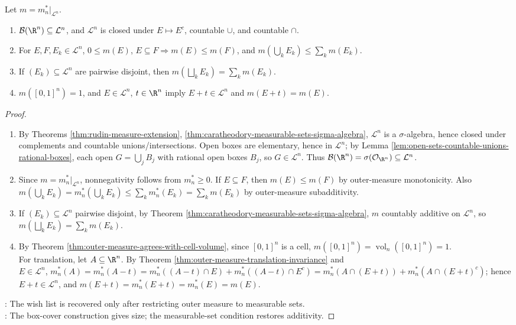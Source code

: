 \begin{theorem} \label{thm:lebesgue-measure-basic-properties-checklist} \\
Let $m=m_n^\ast|_{\mathcal{L}^n}$.
\begin{enumerate}[label=(\roman*)]
\setlength{\itemsep}{0pt}
\item $\mathcal{B}(\R^n)\subseteq\mathcal{L}^n$, and $\mathcal{L}^n$ is closed under $E\mapsto E^c$, countable $\cup$, and countable $\cap$.
\item For $E,F,E_k\in\mathcal{L}^n$, $0\leq m(E)$, $E\subseteq F\Rightarrow m(E)\leq m(F)$, and $m(\bigcup_kE_k)\leq\sum_km(E_k)$.
\item If $(E_k)\subseteq\mathcal{L}^n$ are pairwise disjoint, then $m(\bigsqcup_kE_k)=\sum_km(E_k)$.
\item $m([0,1]^n)=1$, and $E\in\mathcal{L}^n$, $t\in\R^n$ imply $E+t\in\mathcal{L}^n$ and $m(E+t)=m(E)$.
\end{enumerate}
\begin{proof}
\begin{enumerate}[label=(\roman*)]
\setlength{\itemsep}{0pt}
\item By Theorems \ref{thm:rudin-measure-extension}, \ref{thm:caratheodory-measurable-sets-sigma-algebra}, $\mathcal{L}^n$ is a $\sigma$-algebra, hence closed under complements and countable unions/intersections. Open boxes are elementary, hence in $\mathcal{L}^n$; by Lemma \ref{lem:open-sets-countable-unions-rational-boxes}, each open $G=\bigcup_jB_j$ with rational open boxes $B_j$, so $G\in\mathcal{L}^n$. Thus $\mathcal{B}(\R^n)=\sigma(\mathcal{O}_{\R^n})\subseteq\mathcal{L}^n$.
\item Since $m=m_n^\ast|_{\mathcal{L}^n}$, nonnegativity follows from $m_n^\ast\geq0$. If $E\subseteq F$, then $m(E)\leq m(F)$ by outer-measure monotonicity. Also $m(\bigcup_kE_k)=m_n^\ast(\bigcup_kE_k)\leq\sum_km_n^\ast(E_k)=\sum_km(E_k)$ by outer-measure subadditivity.
\item If $(E_k)\subseteq\mathcal{L}^n$ pairwise disjoint, by Theorem \ref{thm:caratheodory-measurable-sets-sigma-algebra}, $m$ countably additive on $\mathcal{L}^n$, so $m(\bigsqcup_kE_k)=\sum_km(E_k)$.
\item By Theorem \ref{thm:outer-measure-agrees-with-cell-volume}, since $[0,1]^n$ is a cell, $m([0,1]^n)=\operatorname{vol}_n([0,1]^n)=1$.\\
For translation, let $A\subseteq\R^n$. By Theorem \ref{thm:outer-measure-translation-invariance} and\\
$E\in\mathcal{L}^n$, $m_n^\ast(A)=m_n^\ast(A-t)=m_n^\ast((A-t)\cap E)+m_n^\ast((A-t)\cap E^c)=m_n^\ast(A\cap(E+t))+m_n^\ast(A\cap(E+t)^c)$; hence $E+t\in\mathcal{L}^n$, and $m(E+t)=m_n^\ast(E+t)=m_n^\ast(E)=m(E)$.
\end{enumerate}
: The wish list is recovered only after restricting outer measure to measurable sets.\\
: The box-cover construction gives size; the measurable-set condition restores additivity.
\end{proof}
\end{theorem}

